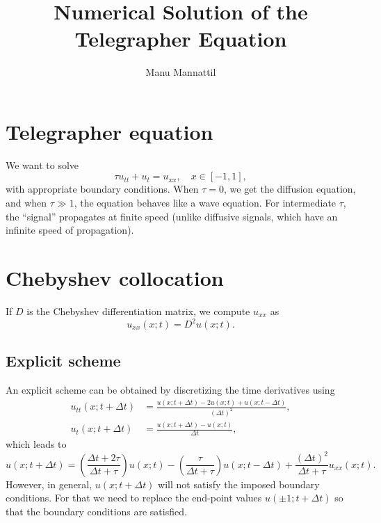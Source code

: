\documentclass[11pt]{article}
\begin{document}
\title{Numerical Solution of the Telegrapher Equation}
\author{Manu Mannattil}
\maketitle

\section{Telegrapher equation}

We want to solve
%
\begin{equation}
  \tau u_{tt} + u_{t} = u_{xx},
  \quad x \in [-1, 1],
\end{equation}
%
with appropriate boundary conditions.
When $\tau = 0$, we get the diffusion equation, and when $\tau \gg 1$, the equation behaves like a wave equation.
For intermediate $\tau$, the ``signal'' propagates at finite speed (unlike diffusive signals, which have an infinite speed of propagation).

\section{Chebyshev collocation}

If $D$ is the Chebyshev differentiation matrix, we compute $u_{xx}$ as
%
\begin{equation}
  u_{xx}(x; t) = D^{2}u(x; t).
\end{equation}
%

\subsection{Explicit scheme}

An explicit scheme can be obtained by discretizing the time derivatives using
%
\begin{equation}\begin{aligned}
  u_{tt}(x; t + \Delta t) &= \frac{u(x; t + \Delta t) - 2u(x; t) + u(x; t - \Delta t)}{(\Delta t)^{2}},\\
  u_{t}(x; t + \Delta t) &= \frac{u(x; t + \Delta t) - u(x; t)}{\Delta t},
\end{aligned}\end{equation}
%
which leads to
%
\begin{equation}
  u(x; {t + \Delta t}) = \left(\frac{\Delta t + 2\tau}{\Delta t + \tau}\right)u(x; t) - \left(\frac{\tau}{\Delta t + \tau}\right)u(x; t - \Delta t) + \frac{(\Delta t)^{2}}{\Delta t + \tau}u_{xx}(x; t).
\end{equation}
%
However, in general, $u(x; t + \Delta t)$ will not satisfy the imposed boundary conditions.
For that we need to replace the end-point values $u(\pm 1; t + \Delta t)$ so that the boundary conditions are satisfied.
\end{document}
